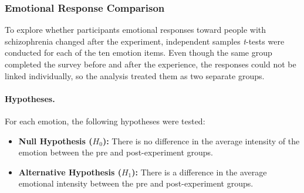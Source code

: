 

\subsubsection{Emotional Response Comparison}

To explore whether participants emotional responses toward people with schizophrenia changed after the experiment, independent samples \textit{t}-tests were conducted for each of the ten emotion items. Even though the same group completed the survey before and after the experience, the responses could not be linked individually, so the analysis treated them as two separate groups.

\paragraph{Hypotheses.} For each emotion, the following hypotheses were tested:

\begin{itemize}
    \item \textbf{Null Hypothesis ($H_0$):} There is no difference in the average intensity of the emotion between the pre and post-experiment groups.
    \item \textbf{Alternative Hypothesis ($H_1$):} There is a difference in the average emotional intensity between the pre and post-experiment groups.
\end{itemize}



